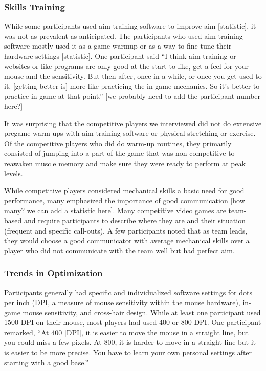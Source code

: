 \documentclass[11pt,manuscript,screen,review]{acmart} %
\begin{document}
\subsubsection{Skills Training}

While some participants used aim training software to improve aim [statistic], it was not as prevalent as anticipated. The participants who used aim training software mostly used it as a game warmup or as a way to fine-tune their hardware settings [statistic]. One participant said “I think aim training or websites or like programs are only good at the start to like, get a feel for your mouse and the sensitivity. But then after, once in a while, or once you get used to it, [getting better is] more like practicing the in-game mechanics. So it's better to practice in-game at that point.” [we probably need to add the participant number here?]

It was surprising that the competitive players we interviewed did not do extensive pregame warm-ups with aim training software or physical stretching or exercise. Of the competitive players who did do warm-up routines, they primarily consisted of jumping into a part of the game that was non-competitive to reawaken muscle memory and make sure they were ready to perform at peak levels.

While competitive players considered mechanical skills a basic need for good performance, many emphasized the importance of good communication [how many? we can add a statistic here]. Many competitive video games are team-based and require participants to describe where they are and their situation (frequent and specific call-outs). A few participants noted that as team leads, they would choose a good communicator with average mechanical skills over a player who did not communicate with the team well but had perfect aim.

\subsubsection{Trends in Optimization}

Participants generally had specific and individualized software settings for dots per inch (DPI, a measure of mouse sensitivity within the mouse hardware), in-game mouse sensitivity, and cross-hair design. While at least one participant used 1500 DPI on their mouse, most players had used 400 or 800 DPI. One participant remarked, “At 400 [DPI], it is easier to move the mouse in a straight line, but you could miss a few pixels. At 800, it is harder to move in a straight line but it is easier to be more precise. You have to learn your own personal settings after starting with a good base.” 
\end{document}
